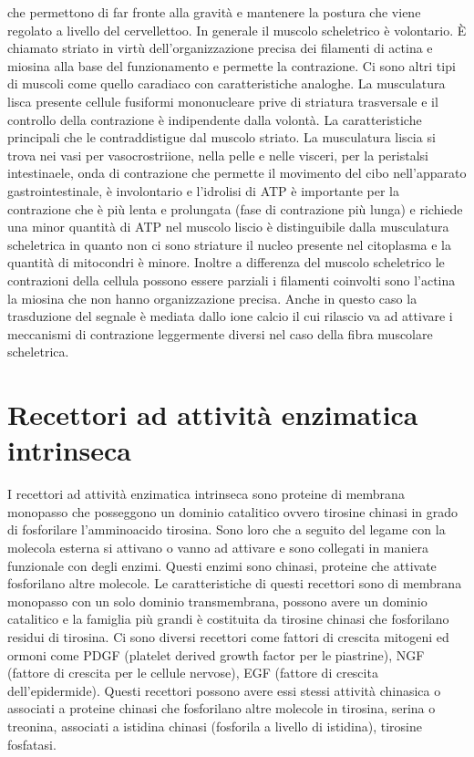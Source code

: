 che permettono di far fronte alla gravit\`a e mantenere la postura che viene regolato a livello del cervellettoo. In generale il muscolo scheletrico \`e volontario. \`E chiamato 
striato in virt\`u dell'organizzazione precisa dei filamenti di actina e miosina alla base del funzionamento e permette la contrazione. Ci sono altri tipi di muscoli come quello caradiaco
con caratteristiche analoghe. La musculatura lisca presente cellule fusiformi mononucleare prive di striatura trasversale e il controllo della contrazione \`e indipendente dalla 
volont\`a. La caratteristiche principali che le contraddistigue dal muscolo striato. La musculatura liscia si trova nei vasi per vasocrostriione, nella pelle e nelle visceri, per la 
peristalsi intestinaele, onda di contrazione che permette il movimento del cibo nell'apparato gastrointestinale, \`e involontario e l'idrolisi di ATP \`e importante per la contrazione
che \`e pi\`u lenta e prolungata (fase di contrazione pi\`u lunga) e richiede una minor quantit\`a di ATP nel muscolo liscio \`e distinguibile dalla musculatura scheletrica in quanto non
ci sono striature il nucleo presente nel citoplasma e la quantit\`a di mitocondri \`e minore. Inoltre a differenza del muscolo scheletrico le contrazioni della cellula possono essere
parziali i filamenti coinvolti sono l'actina la miosina che non hanno organizzazione precisa. Anche in questo caso la trasduzione del segnale \`e mediata dallo ione calcio il cui rilascio
va ad attivare i meccanismi di contrazione leggermente diversi nel caso della fibra muscolare scheletrica. 
\section{Recettori ad attivit\`a enzimatica intrinseca}
I recettori ad attivit\`a enzimatica intrinseca sono proteine di membrana monopasso che posseggono un dominio catalitico ovvero tirosine chinasi in grado di fosforilare l'amminoacido 
tirosina. Sono loro che a seguito del legame con la molecola esterna si attivano o vanno ad attivare e sono collegati in maniera funzionale con degli enzimi. Questi enzimi sono 
chinasi, proteine che attivate  fosforilano altre molecole. Le caratteristiche di questi recettori sono di membrana monopasso con un solo dominio transmembrana, possono avere un
dominio catalitico e la famiglia pi\`u grandi \`e costituita da tirosine chinasi che fosforilano residui di tirosina. Ci sono diversi recettori come fattori di crescita mitogeni ed 
ormoni come PDGF (platelet derived growth factor per le piastrine), NGF (fattore di crescita per le cellule nervose), EGF (fattore di crescita dell'epidermide). Questi recettori possono
avere essi stessi attivit\`a chinasica o associati a proteine chinasi che fosforilano altre molecole in tirosina, serina o treonina, associati a istidina chinasi (fosforila a livello di 
istidina), tirosine fosfatasi. 
